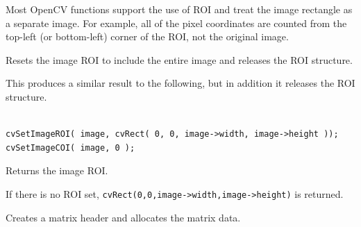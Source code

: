 Most OpenCV functions support the use of ROI and treat the image rectangle as a separate image. For example, all of the pixel coordinates are counted from the top-left (or bottom-left) corner of the ROI, not the original image.

\label{ResetImageROI}

Resets the image ROI to include the entire image and releases the ROI structure.


\begin{description}
\end{description}

This produces a similar result to the following, but in addition it releases the ROI structure.

\begin{lstlisting}

cvSetImageROI( image, cvRect( 0, 0, image->width, image->height ));
cvSetImageCOI( image, 0 );

\end{lstlisting}


\label{GetImageROI}

Returns the image ROI.


\begin{description}
\end{description}


If there is no ROI set, \texttt{cvRect(0,0,image->width,image->height)} is returned.


\label{CreateMat}\label{cvCreateMat}

Creates a matrix header and allocates the matrix data. 


